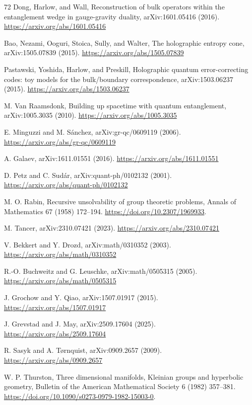 \documentclass[11pt,letterpaper]{article}
\theoremstyle{definition}
\begin{document}
\begin{thebibliography}{72}
 Dong, Harlow, and Wall, Reconstruction of bulk operators within the entanglement wedge in gauge-gravity duality, arXiv:1601.05416 (2016). \url{https://arxiv.org/abs/1601.05416}

 Bao, Nezami, Ooguri, Stoica, Sully, and Walter, The holographic entropy cone, arXiv:1505.07839 (2015). \url{https://arxiv.org/abs/1505.07839}

 Pastawski, Yoshida, Harlow, and Preskill, Holographic quantum error-correcting codes: toy models for the bulk/boundary correspondence, arXiv:1503.06237 (2015). \url{https://arxiv.org/abs/1503.06237}

 M. Van Raamsdonk, Building up spacetime with quantum entanglement, arXiv:1005.3035 (2010). \url{https://arxiv.org/abs/1005.3035}

 E. Minguzzi and M. S\'anchez, arXiv:gr-qc/0609119 (2006). \url{https://arxiv.org/abs/gr-qc/0609119}

 A. Galaev, arXiv:1611.01551 (2016). \url{https://arxiv.org/abs/1611.01551}

 D. Petz and C. Sud\'ar, arXiv:quant-ph/0102132 (2001). \url{https://arxiv.org/abs/quant-ph/0102132}

 M. O. Rabin, Recursive unsolvability of group theoretic problems, Annals of Mathematics 67 (1958) 172--194. \url{https://doi.org/10.2307/1969933}.

 M. Tancer, arXiv:2310.07421 (2023). \url{https://arxiv.org/abs/2310.07421}

 V. Bekkert and Y. Drozd, arXiv:math/0310352 (2003). \url{https://arxiv.org/abs/math/0310352}

 R.-O. Buchweitz and G. Leuschke, arXiv:math/0505315 (2005). \url{https://arxiv.org/abs/math/0505315}

 J. Grochow and Y. Qiao, arXiv:1507.01917 (2015). \url{https://arxiv.org/abs/1507.01917}

 J. Grevstad and J. May, arXiv:2509.17604 (2025). \url{https://arxiv.org/abs/2509.17604}

 R. Sasyk and A. T\o rnquist, arXiv:0909.2657 (2009). \url{https://arxiv.org/abs/0909.2657}

 W. P. Thurston, Three dimensional manifolds, Kleinian groups and hyperbolic geometry, Bulletin of the American Mathematical Society 6 (1982) 357--381. \url{https://doi.org/10.1090/s0273-0979-1982-15003-0}.


\end{thebibliography}
\end{document}
